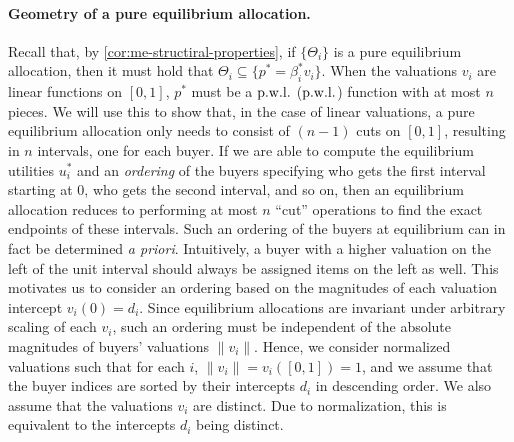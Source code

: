 \paragraph{Geometry of a pure equilibrium allocation.} 
Recall that, by \cref{cor:me-structiral-properties}, if $\{\Theta_i\}$ is a pure equilibrium allocation, then it must hold that $\Theta_i \subseteq \{p^* = \beta^*_i v_i \}$. 
When the valuations $v_i$ are linear functions on $[0,1]$, $p^*$ must be a ${\rm p.w.l.}$ (${\rm p.w.l.}$) function with at most $n$ pieces. 
We will use this to show that, in the case of linear valuations, a pure equilibrium allocation only needs to consist of $(n-1)$ cuts on $[0,1]$, resulting in $n$ intervals, one for each buyer. 
If we are able to compute the equilibrium utilities $u^*_i$ and an \emph{ordering} of the buyers specifying who gets the first interval starting at $0$, who gets the second interval, and so on, then an equilibrium allocation reduces to performing at most $n$ ``cut'' operations to find the exact endpoints of these intervals. 
Such an ordering of the buyers at equilibrium can in fact be determined \emph{a priori}. 
Intuitively, a buyer with a higher valuation on the left of the unit interval should always be assigned items on the left as well. 
This motivates us to consider an ordering based on the magnitudes of each valuation intercept $v_i(0) = d_i$. 
Since equilibrium allocations are invariant under arbitrary scaling of each $v_i$, such an ordering must be independent of the absolute magnitudes of buyers' valuations $\|v_i\|$. 
Hence, we consider normalized valuations such that for each $i$, $\|v_i\| = v_i([0,1]) = 1$, and we assume that the buyer indices are sorted by their intercepts $d_i$ in descending order. 
We also assume that the valuations $v_i$ are distinct. Due to normalization, this is equivalent to the intercepts $d_i$ being distinct. 

